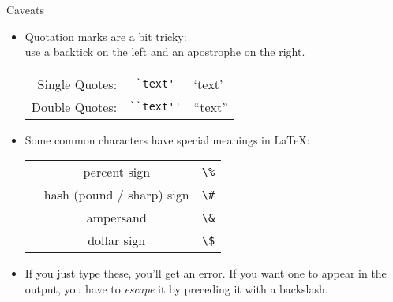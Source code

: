 \begin{frame}[fragile]{Caveats}
    \small
    \begin{itemize}
        \item Quotation marks are a bit tricky:\\
              use a backtick \keystroke{\`{}} on the left and an apostrophe \keystroke{\'{}} on the right.
              \begin{tabular}{rcl}
                  Single Quotes: & \verb|`text'|   & `text'   \\
                  Double Quotes: & \verb|``text''| & ``text''
              \end{tabular}

        \item Some common characters have special meanings in \LaTeX:
              \\[1ex]
              \begin{tabular}{rcl}
                  \keystrokebftt{\%} & percent sign              & \verb|\%| \\
                  \keystrokebftt{\#} & hash (pound / sharp) sign & \verb|\#| \\
                  \keystrokebftt{\&} & ampersand                 & \verb|\&| \\
                  \keystrokebftt{\$} & dollar sign               & \verb|\$|
              \end{tabular}
        \item If you just type these, you'll get an error. If you want one to appear in the output, you have to \emph{escape} it by preceding it with a backslash.
    \end{itemize}
\end{frame}


